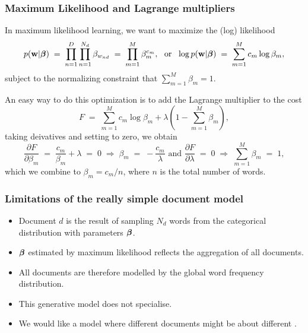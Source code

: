 \begin{frame}
\frametitle{Maximum Likelihood and Lagrange multipliers}

In maximum likelihood learning, we want to maximize the (log) likelihood
%
\[
p({\bf
  w}|\boldsymbol{\beta})\;=\;\prod_{n=1}^D\prod_{n=1}^{N_d}\beta_{w_{nd}}\;=\;
\prod_{m=1}^M\beta_m^{c_m},\text{\ \ or\ \ }
\log p({\bf w}|\boldsymbol{\beta})\;=\;\sum_{m=1}^Mc_m\log \beta_m,
\]
subject to the normalizing constraint that $\sum_{m=1}^M\beta_m=1$.

An easy way to do this optimization is to add the Lagrange multiplier
to the cost
%
\[
F\;=\; \sum_{m=1}^Mc_m\log \beta_m + \lambda(1-\sum_{m=1}^M\beta_m),
\]
%
taking deivatives and setting to zero, we obtain
\[
\frac{\partial F}{\partial
  \beta_m}\;=\;\frac{c_m}{\beta_m}+\lambda\;=\;0\;\Rightarrow\;\beta_m\;=\;-\frac{c_m}{\lambda}
\text{\ \ and\ \ }
\frac{\partial F}{\partial \lambda}\;=\;0\;\Rightarrow\;\sum_{m=1}^M\beta_m\;=\;1,
\]
%
which we combine to $\beta_m=c_m/n$, where $n$ is the total number of words.
\end{frame}


\begin{frame}
\frametitle{Limitations of the really simple document model}

\begin{itemize}
\item Document $d$ is the result of sampling $N_d$ words from the
  categorical distribution with parameters $\boldsymbol{\beta}$.
\item $\boldsymbol{\beta}$ estimated by maximum likelihood reflects the aggregation of all documents.
\item All documents are therefore modelled by the global word frequency distribution.
\item This generative model does not specialise. %
\item We would like a model where different documents might be about different .
\end{itemize}

\end{frame}


